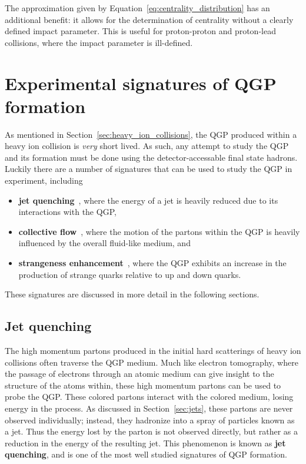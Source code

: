 The approximation given by Equation~\ref{eq:centrality_distribution} has an additional benefit: it allows for the determination of centrality without a clearly defined impact parameter. This is useful for proton-proton and proton-lead collisions, where the impact parameter is ill-defined. 

\section{Experimental signatures of QGP formation}
\label{sec:qgp_signatures}

As mentioned in Section~\ref{sec:heavy_ion_collisions}, the QGP produced within a heavy ion collision is \textit{very} short lived. As such, any attempt to study the QGP and its formation must be done using the detector-accessable final state hadrons. Luckily there are a number of signatures that can be used to study the QGP in experiment, including
%
\begin{itemize}
    \item \textbf{jet quenching}~\cite{JetQuenching}, where the energy of a jet is heavily reduced due to its interactions with the QGP,
    \item \textbf{collective flow}~\cite{CollectiveFlow}, where the motion of the partons within the QGP is heavily influenced by the overall fluid-like medium, and
    \item \textbf{strangeness enhancement}~\cite{Strangeness}, where the QGP exhibits an increase in the production of strange quarks relative to up and down quarks.
\end{itemize}
%
These signatures are discussed in more detail in the following sections.

\subsection{Jet quenching}
\label{sec:jet_quenching}

The high momentum partons produced in the initial hard scatterings of heavy ion collisions often traverse the QGP medium. Much like electron tomography, where the passage of electrons through an atomic medium can give insight to the structure of the atoms within, these high momentum partons can be used to probe the QGP. These colored partons interact with the colored medium, losing energy in the process. As discussed in Section~\ref{sec:jets}, these partons are never observed individually; instead, they hadronize into a spray of particles known as a jet. Thus the energy lost by the parton is not observed directly, but rather as a reduction in the energy of the resulting jet. This phenomenon is known as \textbf{jet quenching}, and is one of the most well studied signatures of QGP formation.


